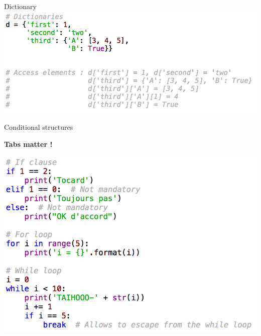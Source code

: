 \documentclass[11pt,unknownkeysallowed,usenames,dvipsnames]{beamer}
\begin{document}
\begin{frame}{Dictionary}
    \includegraphics[width=0.9\linewidth]{code-dictionaries}
\end{frame}


%        
%        
%    
\begin{frame}{Conditional structures}
    \vspace{-5pt}
    \begin{center}
        \textbf{Tabs matter !}
    \end{center}
    \vspace{-5pt}
    \includegraphics[width=0.8\linewidth]{code-conditional-structures}

\end{frame}
\end{document}
